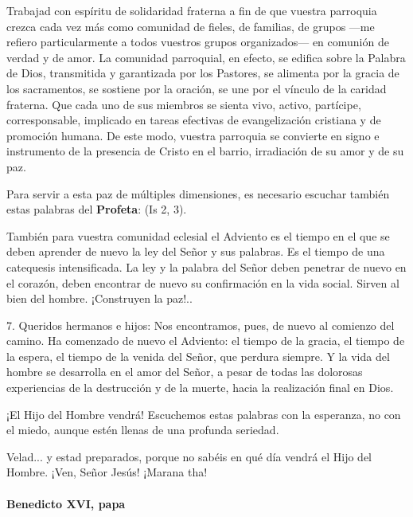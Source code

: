 Trabajad con espíritu de solidaridad fraterna a fin de que vuestra parroquia crezca cada vez más como comunidad de fieles, de familias, de grupos ---me refiero particularmente a todos vuestros grupos organizados--- en comunión de verdad y de amor. La comunidad parroquial, en efecto, se edifica sobre la Palabra de Dios, transmitida y garantizada por los Pastores, se alimenta por la gracia de los sacramentos, se sostiene por la oración, se une por el vínculo de la caridad fraterna. Que cada uno de sus miembros se sienta vivo, activo, partícipe, corresponsable, implicado en tareas efectivas de evangelización cristiana y de promoción humana. De este modo, vuestra parroquia se convierte en signo e instrumento de la presencia de Cristo en el barrio, irradiación de su amor y de su paz.

Para servir a esta paz de múltiples dimensiones, es necesario escuchar también estas palabras del \textbf{Profeta}:  (Is 2, 3).

También para vuestra comunidad eclesial el Adviento es el tiempo en el que se deben aprender de nuevo la ley del Señor y sus palabras. Es el tiempo de una catequesis intensificada. La ley y la palabra del Señor deben penetrar de nuevo en el corazón, deben encontrar de nuevo su confirmación en la vida social. Sirven al bien del hombre. ¡Construyen la paz!..

7. Queridos hermanos e hijos: Nos encontramos, pues, de nuevo al comienzo del camino. Ha comenzado de nuevo el Adviento: el tiempo de la gracia, el tiempo de la espera, el tiempo de la venida del Señor, que perdura siempre. Y la vida del hombre se desarrolla en el amor del Señor, a pesar de todas las dolorosas experiencias de la destrucción y de la muerte, hacia la realización final en Dios.

¡El Hijo del Hombre vendrá! Escuchemos estas palabras con la esperanza, no con el miedo, aunque estén llenas de una profunda seriedad.

Velad... y estad preparados, porque no sabéis en qué día vendrá el Hijo del Hombre. ¡Ven, Señor Jesús! ¡Marana tha!


\paragraph{Benedicto XVI, papa}\label{benedicto-xvi-papa}

